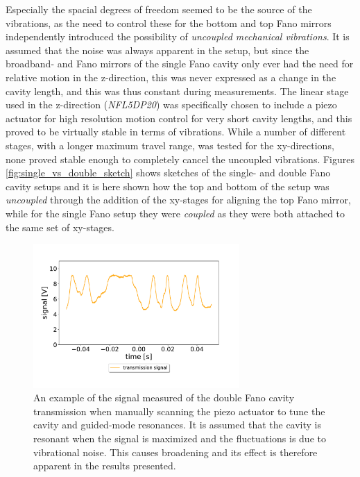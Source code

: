 Especially the spacial degrees of freedom seemed to be the source of the vibrations, as the need to control these for the bottom and top Fano mirrors independently introduced the possibility of \emph{uncoupled mechanical vibrations}. It is assumed that the noise was always apparent in the setup, but since the broadband- and Fano mirrors of the single Fano cavity only ever had the need for relative motion in the z-direction, this was never expressed as a change in the cavity length, and this was thus constant during measurements. The linear stage used in the z-direction (\emph{NFL5DP20}) was specifically chosen to include a piezo actuator for high resolution motion control for very short cavity lengths, and this proved to be virtually stable in terms of vibrations. While a number of different stages, with a longer maximum travel range, was tested for the xy-directions, none proved stable enough to completely cancel the uncoupled vibrations. Figures \ref{fig:single_vs_double_sketch} shows sketches of the single- and double Fano cavity setups and it is here shown how the top and bottom of the setup was \emph{uncoupled} through the addition of the xy-stages for aligning the top Fano mirror, while for the single Fano setup they were \emph{coupled} as they were both attached to the same set of xy-stages. 

\begin{figure}[h!]
    \centering
    \includegraphics[width=0.7\textwidth]{figures/results/noise_on_resonance.pdf}
    \caption{ An example of the signal measured of the double Fano cavity transmission when manually scanning the piezo actuator to tune the cavity and guided-mode resonances. It is assumed that the cavity is resonant when the signal is maximized and the fluctuations is due to vibrational noise. This causes broadening and its effect is therefore apparent in the results presented.}
    \label{fig:noise_on_resonance}
\end{figure}

